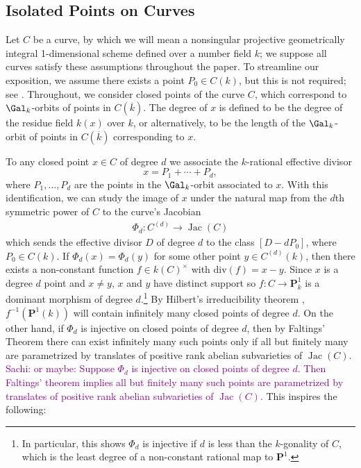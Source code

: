 \documentclass[11pt,reqno]{amsart}
\theoremstyle{plain}
\theoremstyle{definition}
\newcommand{\Jac}{\operatorname{Jac}}
\newcommand{\sachi}[1]{\textcolor{purple}{Sachi: #1}}
\begin{document}
\subsection{Isolated Points on Curves}
Let $C$ be a curve, by which we will mean a nonsingular projective geometrically integral 1-dimensional scheme defined over a number field $k$; we suppose all curves satisfy these assumptions throughout the paper. To streamline our exposition, we assume there exists a point $P_0 \in C(k)$, but this is not required; see \cite[$\S4$]{BELOV}. Throughout, we consider closed points of the curve $C$, which correspond to $\Gal_k$-orbits of points in $C(\overline{k})$. The degree of $x$ is defined to be the degree of the residue field $k(x)$ over $k$, or alternatively, to be the length of the $\Gal_k$-orbit of points in $C(\overline{k})$ corresponding to $x$.

To any closed point $x \in C$ of degree $d$ we associate the $k$-rational effective divisor 
\[
 x=P_1+ \cdots +P_{d},
\]
where $P_1, \dots, P_{d}$ are the points in the $\Gal_{k}$-orbit associated to $x$. With this identification, we can study the image of $x$ under the natural map from the $d$th symmetric power of $C$ to the curve's Jacobian
\begin{align}
\label{eqn:phid}
\Phi_d: C^{(d)} \rightarrow \Jac(C)
\end{align}
which sends the effective divisor $D$ of degree $d$ to the class $[D - dP_0]$, where $P_0 \in C(k)$. If $\Phi_d(x)=\Phi_d(y)$ for some other point $y \in C^{(d)}(k)$, then there exists a non-constant function $f \in k(C)^{\times}$ with $\text{div}(f)=x-y$. Since $x$ is a degree $d$ point and $x\not=y$, $x$ and $y$ have distinct support so $f: C \rightarrow \mathbf{P}^1_{k}$ is a dominant morphism of degree $d$.\footnote{In particular, this shows $\Phi_d$ is injective if $d$ is less than the $k$-gonality of $C$, which is the least degree of a non-constant rational map to $\mathbf{P}^1$.} By Hilbert's irreducibility theorem \cite[Chapter 9]{serre97}, $f^{-1}(\mathbf{P}^{1}(k))$ will contain infinitely many closed points of degree $d$. On the other hand, if $\Phi_d$ is injective on closed points of degree $d$, then by Faltings' Theorem \cite{faltings} there can exist infinitely many such points only if all but finitely many are parametrized by translates of positive rank abelian subvarieties of $\Jac(C)$. \sachi{or maybe: Suppose $\Phi_d$ is injective on closed points of degree $d$. Then Faltings' theorem \cite{faltings} implies all but finitely many such points are parametrized by translates of positive rank abelian subvarieties of $\Jac(C)$.}
This inspires the following:
\end{document}
